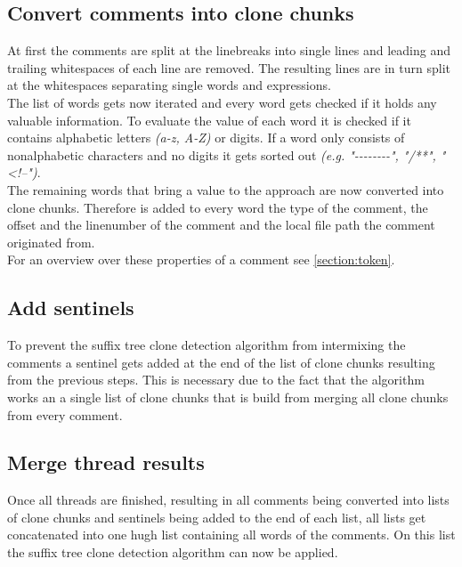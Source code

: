 \subsection{Convert comments into clone chunks}
At first the comments are split at the linebreaks into single lines and leading and trailing whitespaces of each line are removed. The resulting lines are in turn split at the whitespaces separating single words and expressions.\\
The list of words gets now iterated and every word gets checked if it holds any valuable information. To evaluate the value of each word it is checked if it contains alphabetic letters \textit{(a-z, A-Z)} or digits. If a word only consists of nonalphabetic characters and no digits it gets sorted out \textit{(e.g. "-{}-{}-{}-{}-{}-{}-{}-", "/**", "<!--")}.\\
The remaining words that bring a value to the approach are now converted into clone chunks. Therefore is added to every word the type of the comment, the offset and the linenumber of the comment and the local file path the comment originated from.\\
For an overview over these properties of a comment see \ref{section:token}.

\subsection{Add sentinels}
To prevent the suffix tree clone detection algorithm from intermixing the comments a sentinel gets added at the end of the list of clone chunks resulting from the previous steps. This is necessary due to the fact that the algorithm works an a single list of clone chunks that is build from merging all clone chunks from every comment.

\subsection{Merge thread results}
Once all threads are finished, resulting in all comments being converted into lists of clone chunks and sentinels being added to the end of each list, all lists get concatenated into one hugh list containing all words of the comments. On this list the suffix tree clone detection algorithm can now be applied.


